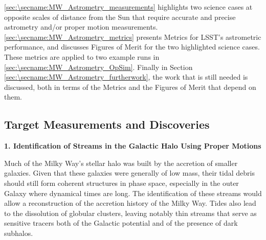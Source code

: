 \autoref{sec:\secname:MW_Astrometry_measurements} highlights two
science cases at opposite scales of distance from the Sun that require
accurate and precise astrometry and/or proper motion
measurements. \autoref{sec:\secname:MW_Astrometry_metrics} presents
Metrics for LSST's astrometric performance, and discusses Figures of
Merit for the two highlighted science cases. These metrics are applied to two example \OpSim runs in
\autoref{sec:\secname:MW_Astrometry_OpSim}. Finally in Section
\ref{sec:\secname:MW_Astrometry_furtherwork}, the work that is still
needed is discussed, both in terms of the Metrics and the Figures of
Merit that depend on them.




\subsection{Target Measurements and Discoveries}
\label{sec:\secname:MW_Astrometry_measurements}


{\bf 1. Identification of Streams in the Galactic Halo Using Proper Motions}

Much of the Milky Way's stellar halo was built by the accretion of smaller galaxies. Given that these galaxies
were generally of low mass, their tidal debris should still form coherent structures in phase space, especially
in the outer Galaxy where dynamical times are long. The identification of these streams would allow
a reconstruction of the accretion history of the Milky Way. Tides also lead to the dissolution of globular clusters,
leaving notably thin streams that serve as sensitive tracers both of the Galactic potential and of the presence of dark
subhalos.

